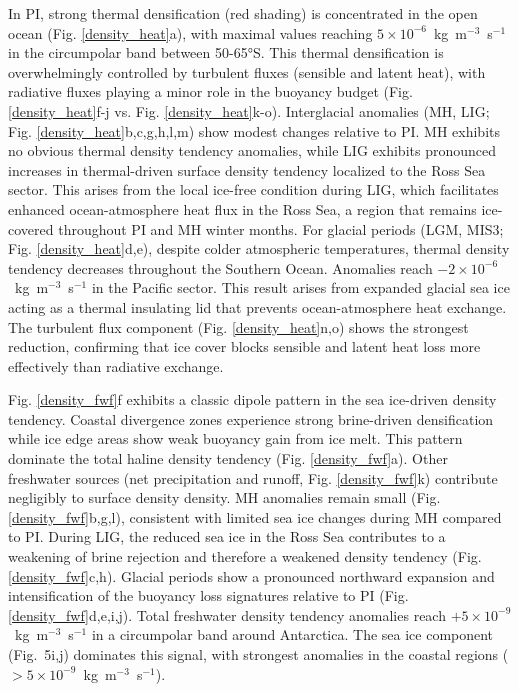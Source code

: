 \documentclass[pdflatex,sn-nature]{sn-jnl}
\begin{document}
In PI, strong thermal densification (red shading) is concentrated in the open ocean (Fig. \ref{density_heat}a), with maximal values reaching $5 \times 10^{-6}$~kg~m$^{-3}$~s$^{-1}$ in the circumpolar band between 50-65°S. This thermal densification is overwhelmingly controlled by turbulent fluxes (sensible and latent heat), with radiative fluxes playing a minor role in the buoyancy budget (Fig. \ref{density_heat}f-j vs. Fig. \ref{density_heat}k-o).
Interglacial anomalies (MH, LIG; Fig. \ref{density_heat}b,c,g,h,l,m) show modest changes relative to PI. MH exhibits no obvious thermal density tendency anomalies, while
LIG exhibits pronounced increases in thermal-driven surface density tendency  localized to the Ross Sea sector. This arises from the local ice-free condition during LIG, which facilitates enhanced ocean-atmosphere heat flux in the Ross Sea, a region that remains ice-covered throughout PI and MH winter months.
For glacial periods (LGM, MIS3; Fig. \ref{density_heat}d,e), despite colder atmospheric temperatures, thermal density tendency decreases throughout the Southern Ocean. Anomalies reach $-2 \times 10^{-6}$~kg~m$^{-3}$~s$^{-1}$ in the Pacific sector. This result arises from expanded glacial sea ice acting as a thermal insulating lid that prevents ocean-atmosphere heat exchange. The turbulent flux component (Fig. \ref{density_heat}n,o) shows the strongest reduction, confirming that ice cover blocks sensible and latent heat loss more effectively than radiative exchange.

Fig. \ref{density_fwf}f exhibits a classic dipole pattern in the sea ice-driven density tendency.  Coastal divergence zones experience strong brine-driven densification while ice edge areas show weak buoyancy gain from ice melt. This pattern dominate the total haline density tendency (Fig. \ref{density_fwf}a). Other freshwater sources (net precipitation and runoff,  Fig. \ref{density_fwf}k) contribute negligibly to surface density density.
MH anomalies remain small (Fig. \ref{density_fwf}b,g,l), consistent with limited sea ice changes during MH compared to PI. During LIG, the reduced sea ice in the Ross Sea contributes to a weakening of brine rejection and therefore a weakened density tendency (Fig. \ref{density_fwf}c,h).
Glacial periods show a pronounced northward expansion and intensification of the buoyancy loss signatures relative to PI (Fig. \ref{density_fwf}d,e,i,j). Total freshwater density tendency anomalies reach $+5 \times 10^{-9}$~kg~m$^{-3}$~s$^{-1}$ in a circumpolar band around Antarctica. The sea ice component (Fig.~5i,j) dominates this signal, with strongest anomalies in the coastal regions ($> 5 \times 10^{-9}$~kg~m$^{-3}$~s$^{-1}$).
\end{document}
